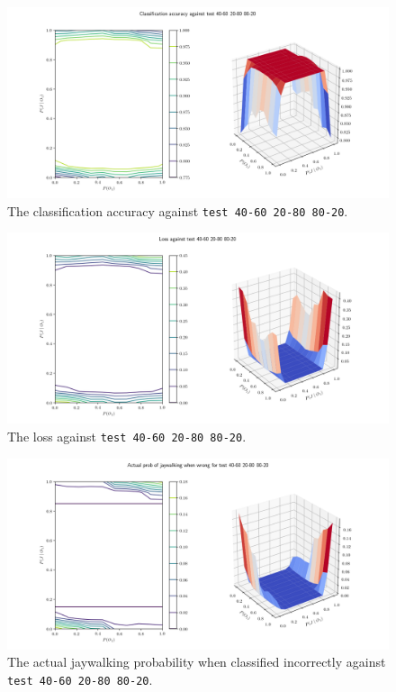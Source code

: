 \documentclass{report}
\newcommand{\code}{\texttt}
\begin{document}
% 
% 

\begin{figure}[h]
    \centering
    \centerline{\includegraphics[scale=0.55]{test_40-60_20-80_80-20_accuracy.png}}
    \caption[]{The classification accuracy against \code{test 40-60 20-80 80-20}.}
    \label{fig:test_40-60_20-80_80-20_accuracy_plot}
\end{figure}

\begin{figure}[h]
    \centering
    \centerline{\includegraphics[scale=0.55]{test_40-60_20-80_80-20_loss.png}}
    \caption[]{The loss against \code{test 40-60 20-80 80-20}.}
    \label{fig:test_40-60_20-80_80-20_loss_plot}
\end{figure}

\begin{figure}[h]
    \centering
    \centerline{\includegraphics[scale=0.55]{test_40-60_20-80_80-20_jay_prob.png}}
    \caption[]{The actual jaywalking probability when classified incorrectly against \code{test 40-60 20-80 80-20}.}
    \label{fig:test_40-60_20-80_80-20_jay_prob_plot}
\end{figure}
\end{document}
